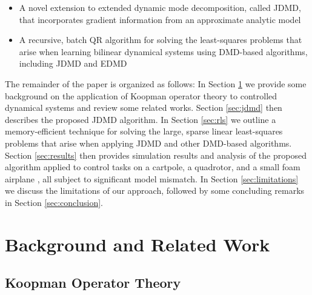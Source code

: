 \documentclass[../root.tex]{subfiles}
\begin{document}
\begin{itemize}
  \item A novel extension to extended dynamic mode decomposition, called JDMD, that
  incorporates gradient information from an approximate analytic model
  
  \item A recursive, batch QR algorithm for solving the least-squares problems that arise 
  when learning bilinear dynamical systems using DMD-based algorithms, including JDMD and EDMD
  
\end{itemize}

The remainder of the paper is organized as follows: In Section
\ref{sec:Preliminaries/Background} we provide some background on the application
of Koopman operator theory to controlled dynamical systems and review some
related works.  Section \ref{sec:jdmd} then describes the proposed JDMD
algorithm.  In Section \ref{sec:rls} we outline a memory-efficient technique for
solving the large, sparse linear least-squares problems that arise when applying
JDMD and other DMD-based algorithms.  
Section \ref{sec:results} then provides simulation results and analysis of the
proposed algorithm applied to control tasks on a cartpole, a quadrotor, and a
small foam airplane , all subject to significant model mismatch.   In Section
\ref{sec:limitations} we discuss the limitations of our approach, followed by
some concluding remarks in Section \ref{sec:conclusion}.

\section{Background and Related Work} \label{sec:Preliminaries/Background}

\subsection{Koopman Operator Theory}
\end{document}
